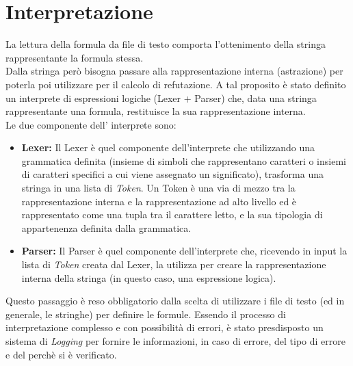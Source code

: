 \documentclass[\main/tesi.tex]{subfiles}
\begin{document}
\section{Interpretazione}
La lettura della formula da file di testo comporta l'ottenimento della stringa rappresentante la formula stessa. \\
Dalla stringa però bisogna passare alla rappresentazione interna (astrazione) per poterla poi utilizzare per il calcolo di refutazione. A tal proposito è stato definito un interprete di espressioni logiche (Lexer + Parser) che, data una stringa rappresentante una formula, restituisce la sua rappresentazione interna. \\
Le due componente dell' interprete sono:
\begin{itemize}
  \item \textbf{Lexer:} Il Lexer è quel componente dell'interprete che utilizzando una grammatica definita (insieme di simboli che rappresentano caratteri o insiemi di caratteri specifici a cui viene assegnato un significato), trasforma una stringa in una lista di \textit{Token}. Un Token è una via di mezzo tra la rappresentazione interna e la rappresentazione ad alto livello ed è rappresentato come una tupla tra il carattere letto, e la sua tipologia di appartenenza definita dalla grammatica.
  \item \textbf{Parser:} Il Parser è quel componente dell'interprete che, ricevendo in input la lista di \textit{Token} creata dal Lexer, la utilizza per creare la rappresentazione interna della stringa (in questo caso, una espressione logica).
\end{itemize}
Questo passaggio è reso obbligatorio dalla scelta di utilizzare i file di testo (ed in generale, le stringhe) per definire le formule.
Essendo il processo di interpretazione complesso e con possibilità di errori, è stato presdisposto un sistema di \textit{Logging} per fornire le informazioni, in caso di errore, del tipo di errore e del perchè si è verificato. \\
\end{document}
